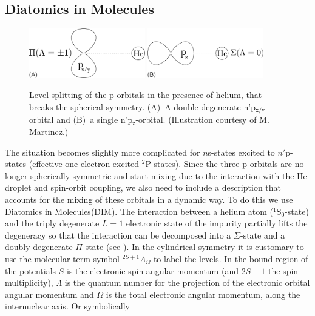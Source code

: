 		\subsection{Diatomics in Molecules}\label{sec:dim-model}
			\begin{figure}[t]
				\begin{center}
					\includegraphics[width=0.45\textwidth]{pxy-he}
					\hspace{20pt}
					\includegraphics[width=0.45\textwidth]{pz-he}
				\end{center}
				\caption{Level splitting of the p-orbitals in the presence of helium, that breaks the spherical symmetry. (A)~A double degenerate n'p$_\mathrm{x/y}$-orbital and (B)~a single n'p$_\mathrm{z}$-orbital. (Illustration courtesy of M. Martinez\citep{Martinez2017}.)}
				\label{fig:p-orbitals}
			\end{figure}				
			The situation becomes slightly more complicated for $n$s-states excited to $n'$p-states (effective one-electron excited $^2$P-states). Since the three p-orbitals are no longer spherically symmetric and start mixing due to the interaction with the He droplet and spin-orbit coupling, we also need to include a description that accounts for the mixing of these orbitals in a dynamic way. To do this we use Diatomics in Molecules\citep{Ellison1963}(DIM). The interaction between a helium atom ($^1$S$_0$-state) and the triply degenerate $L=1$ electronic state of the impurity partially lifts the degeneracy so that the interaction can be decomposed into a $\Sigma$-state and a doubly degenerate $\Pi$-state (see ). In the cylindrical symmetry it is customary to use the molecular term symbol $^{2S+1}\Lambda_\Omega$ to label the levels. In the bound region of the potentials $S$ is the electronic spin angular momentum (and $2S+1$ the spin multiplicity), $\Lambda$ is the quantum number for the projection of the electronic orbital angular momentum and $\Omega$ is the total electronic angular momentum, along the internuclear axis. Or symbolically
